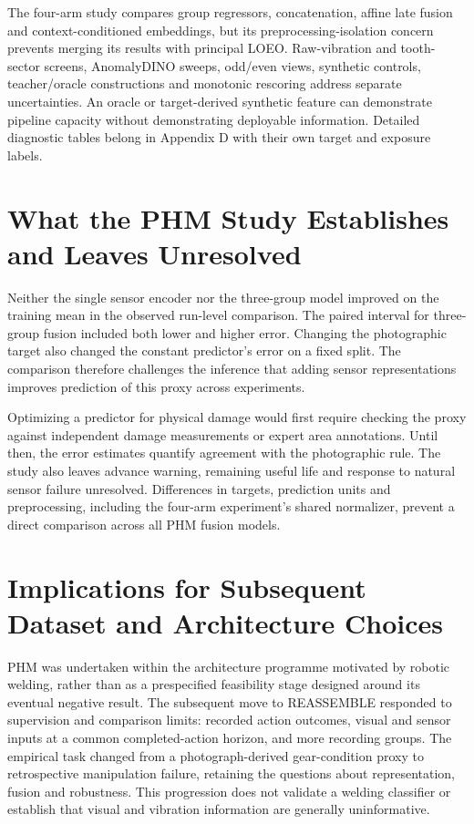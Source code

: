 The four-arm study compares group regressors, concatenation, affine late fusion and context-conditioned embeddings, but its preprocessing-isolation concern prevents merging its results with principal LOEO. Raw-vibration and tooth-sector screens, AnomalyDINO sweeps, odd/even views, synthetic controls, teacher/oracle constructions and monotonic rescoring address separate uncertainties. An oracle or target-derived synthetic feature can demonstrate pipeline capacity without demonstrating deployable information. Detailed diagnostic tables belong in Appendix D with their own target and exposure labels.

\section{What the PHM Study Establishes and Leaves Unresolved}
Neither the single sensor encoder nor the three-group model improved on the training mean in the observed run-level comparison. The paired interval for three-group fusion included both lower and higher error. Changing the photographic target also changed the constant predictor's error on a fixed split. The comparison therefore challenges the inference that adding sensor representations improves prediction of this proxy across experiments.

Optimizing a predictor for physical damage would first require checking the proxy against independent damage measurements or expert area annotations. Until then, the error estimates quantify agreement with the photographic rule. The study also leaves advance warning, remaining useful life and response to natural sensor failure unresolved. Differences in targets, prediction units and preprocessing, including the four-arm experiment's shared normalizer, prevent a direct comparison across all PHM fusion models.

\section{Implications for Subsequent Dataset and Architecture Choices}
PHM was undertaken within the architecture programme motivated by robotic welding, rather than as a prespecified feasibility stage designed around its eventual negative result. The subsequent move to REASSEMBLE responded to supervision and comparison limits: recorded action outcomes, visual and sensor inputs at a common completed-action horizon, and more recording groups. The empirical task changed from a photograph-derived gear-condition proxy to retrospective manipulation failure, retaining the questions about representation, fusion and robustness. This progression does not validate a welding classifier or establish that visual and vibration information are generally uninformative.

